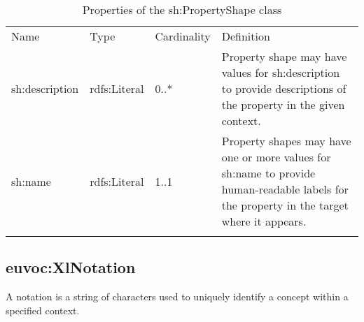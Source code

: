 {
	\footnotesize
	\selectfont%
	\begin{longtable}[c]{@{}p{3cm}p{2cm}p{2cm}p{7.8cm}@{}}
		\toprule\addlinespace
		Name & Type & Cardinality & Definition
		\\\addlinespace
		\midrule\endhead
		sh:description & rdfs:Literal & 0..* & Property shape may have values
		for sh:description to provide descriptions of the property in the given
		context.
		\\\addlinespace
		sh:name & rdfs:Literal & 1..1 & Property shapes may have one or more
		values for sh:name to provide human-readable labels for the property in
		the target where it appears.
		\\\addlinespace
		\bottomrule
		\addlinespace
		\caption{Properties of the sh:PropertyShape class}
	\end{longtable}
}

\subsection{euvoc:XlNotation}

A notation is a string of characters used to uniquely identify a concept
within a specified context.

